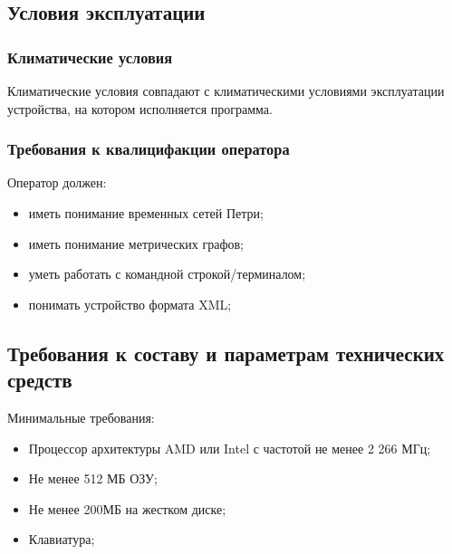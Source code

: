 \documentclass{../TechDoc}
\begin{document}
	\subsection{Условия эксплуатации}
	\subsubsection{Климатические условия}
	Климатические условия совпадают с климатическими условиями эксплуатации устройства,
	на котором исполняется программа.
	
	\subsubsection{Требования к квалицифакции оператора}
	Оператор должен:
	\begin{itemize}
		\item иметь понимание временных сетей Петри;
		\item иметь понимание метрических графов;
		\item уметь работать с командной строкой/терминалом;
		\item понимать устройство формата XML;
	\end{itemize}

	\subsection{Требования к составу и параметрам технических средств}
	Минимальные требования:
	\begin{itemize}
		\item Процессор архитектуры AMD или Intel с частотой не менее 2 266 МГц;
		\item Не менее 512 МБ ОЗУ;
		\item Не менее 200МБ на жестком диске;
		\item Клавиатура;
	\end{itemize}
\end{document}
